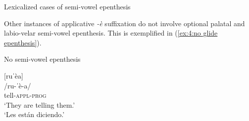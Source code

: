 \ea\label{ex:4:lexicalized cases of semi-vowel epenthesis}
{Lexicalized cases of semi-vowel epenthesis}

    \label{ex:4:lexicalized cases of semi-vowel epenthesisa}
        \label{ex:4:lexicalized cases of semi-vowel epenthesisb}
            \label{ex:4:lexicalized cases of semi-vowel epenthesisc}
                \label{ex:4:lexicalized cases of semi-vowel epenthesisd}
    \z
\z

Other instances of  applicative \textit{-è} suffixation do not involve optional palatal and labio-velar semi-vowel epenthesis. This is exemplified in (\ref{ex:4:no glide epenthesis}).

\ea\label{ex:4:no glide epenthesis}
{No semi-vowel epenthesis}

    [ruˈèa]\\
    /ru-ˈè-a/\\
    tell-\textsc{appl-prog}\\
    `They are telling them.'\\
    `Les están diciendo.' \\

